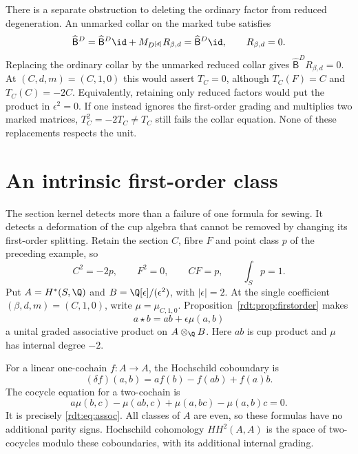 There is a separate obstruction to deleting the ordinary factor from
reduced degeneration. An unmarked collar on the marked tube satisfies
\begin{equation}\label{rdt:eq:collar}
 \widehat{\mathsf B}^D=\widehat{\mathsf B}^D\id+M_{D^{[d]}}R_{\beta,d}
         =\widehat{\mathsf B}^D\id,
 \qquad R_{\beta,d}=0.
\end{equation}
Replacing the ordinary collar by the unmarked reduced collar gives
$\widehat{\mathsf B}^D R_{\beta,d}=0$. At $(C,d,m)=(C,1,0)$ this would assert
$T_C=0$, although $T_C(F)=C$ and $T_C(C)=-2C$.
Equivalently, retaining only reduced factors would put the product
in $\epsilon^2=0$. If one instead ignores the first-order grading
and multiplies two marked matrices, $T_C^2=-2T_C\ne T_C$ still fails
the collar equation. None of these replacements respects the unit.


\section{An intrinsic first-order class}
\label{rdt:sec:Hochschild}

The section kernel detects more than a failure of one formula for
sewing. It detects a deformation of the cup algebra that cannot be
removed by changing its first-order splitting. Retain the section
$C$, fibre $F$ and point class $p$ of the preceding example, so
\[
 C^2=-2p,\qquad F^2=0,\qquad CF=p,\qquad \int_Sp=1.
\]
Put $A=H^*(S,\Q)$ and $B=\Q[\epsilon]/(\epsilon^2)$, with
$|\epsilon|=2$. At the single coefficient $(\beta,d,m)=(C,1,0)$,
write $\mu=\mu_{C,1,0}$. Proposition~\ref{rdt:prop:firstorder}
makes
\[
 a\star b=ab+\epsilon\mu(a,b)
\]
a unital graded associative product on $A\otimes_\Q B$.
Here $ab$ is cup product and $\mu$ has internal degree $-2$.

For a linear one-cochain $f:A\to A$, the Hochschild coboundary is
\[
 (\delta f)(a,b)=af(b)-f(ab)+f(a)b.
\]
The cocycle equation for a two-cochain is
\[
 a\mu(b,c)-\mu(ab,c)+\mu(a,bc)-\mu(a,b)c=0.
\]
It is precisely \eqref{rdt:eq:assoc}. All classes of $A$ are even,
so these formulas have no additional parity signs. Hochschild
cohomology $HH^2(A,A)$ is the space of two-cocycles modulo these
coboundaries, with its additional internal grading.

